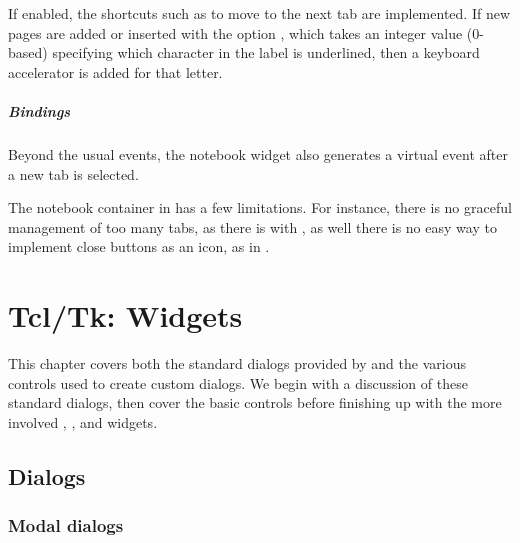 If enabled, the shortcuts such as  to move to the
next tab are implemented. If new pages are added or inserted with the
option , which takes an integer value
(0-based) specifying which character in the label is underlined, then
a keyboard accelerator is added for that letter.

\paragraph{Bindings}
Beyond the usual events, the notebook widget also generates a
 virtual event after a new tab is
selected.

The notebook container in \TK\/ has a few limitations. For instance,
there is no graceful management of too many tabs, as there is with
\GTK, as well there is no easy way to implement close buttons as an
icon, as in \Qt.


\chapter{Tcl/Tk: Widgets}
\label{sec:tcltk:widgets}

This chapter covers both the standard dialogs provided by \TK\/ and
the various controls used to create custom dialogs. We begin with a
discussion of these standard dialogs, then cover the basic controls
before finishing up with the more involved ,
, and  widgets.




\section{Dialogs}
\label{sec:tcltk:dialogs}
\subsection{Modal dialogs}
\label{sec:modal-dialogs}

